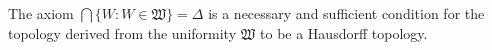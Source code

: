The axiom $\bigcap \{W : W \in \mathfrak{W}\} = \Delta$ is a necessary and sufficient condition for the topology derived from the uniformity $\mathfrak{W}$ to be a Hausdorff topology.

